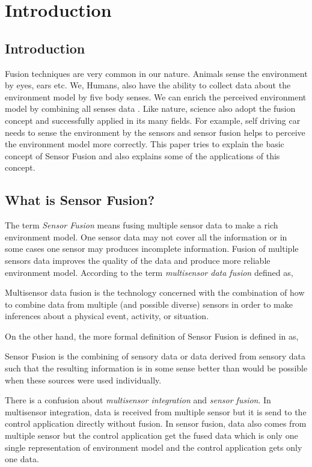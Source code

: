 \chapter{Introduction}

\section{Introduction}
Fusion techniques are very common in our nature. Animals sense the environment by eyes, ears etc. We, Humans, also have the ability to collect data about the environment model by five body senses. We can enrich the perceived environment model by combining all senses data \cite{Wilfried2002}. Like nature, science also adopt the fusion concept and successfully applied in its many fields. For example, self driving car needs to sense the environment by the sensors and sensor fusion helps to perceive the environment model more correctly. This paper tries to explain the basic concept of Sensor Fusion and also explains some of the applications of this concept.

\section{What is Sensor Fusion?}
The term \emph{Sensor Fusion} means fusing multiple sensor data to make a rich environment model. One sensor data may not cover all the information or in some cases one sensor may produces incomplete information. Fusion of multiple sensors data improves the quality of the data and produce more reliable environment model. According to \cite{Hall:2004:MTM:1204261} the term \emph{multisensor data fusion} defined as,
\theoremstyle{definition}
\begin{definition}{Multisensor data fusion}
is the technology concerned with the combination of how to combine data from multiple (and possible diverse) sensors in order to make inferences about a physical event, activity, or situation.
\end{definition}
On the other hand, the more formal definition of Sensor Fusion is defined in \cite{Wilfried2002} as,
\theoremstyle{definition}
\begin{definition}{Sensor Fusion}
is the combining of sensory data or data derived from sensory data such that the resulting information is in some sense better than would be possible when these sources were used individually.
\end{definition}
There is a confusion about \emph{multisensor integration} and \emph{sensor fusion}. In multisensor integration, data is received from multiple sensor but it is send to the control application directly without fusion. In sensor fusion, data also comes from multiple sensor but the control application get the fused data which is only one single representation of environment model and the control application gets only one data.

